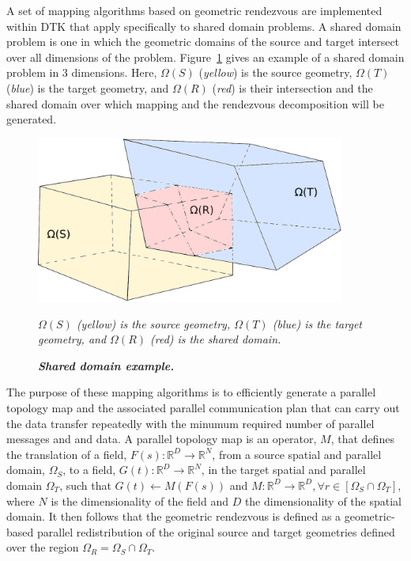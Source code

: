 \documentclass{mc2013}
\begin{document}

A set of mapping algorithms based on geometric rendezvous are
implemented within DTK that apply specifically to shared domain
problems. A shared domain problem is one in which the geometric
domains of the source and target intersect over all dimensions of the
problem. Figure~\ref{fig:shared_domain} gives an example of a shared
domain problem in 3 dimensions. Here, $\Omega(S)$ ({\sl yellow}) is
the source geometry, $\Omega(T)$ ({\sl blue}) is the target geometry,
and $\Omega(R)$ ({\sl red}) is their intersection and the shared
domain over which mapping and the rendezvous decomposition will be
generated.
\begin{figure}[htpb!]
  \centering \includegraphics[width=4in]{overlapping_domain.pdf}
  \caption{\bf \sl Shared domain example.} {\sl $\Omega(S)$ (yellow)
    is the source geometry, $\Omega(T)$ (blue) is the target geometry,
    and $\Omega(R)$ (red) is the shared domain.}
  \label{fig:shared_domain}
\end{figure}
The purpose of these mapping algorithms is to efficiently generate a
parallel topology map and the associated parallel communication plan
that can carry out the data transfer repeatedly with the minumum
required number of parallel messages and and data. A parallel topology
map is an operator, $M$, that defines the translation of a field,
$F(s): \mathbb{R}^D \rightarrow \mathbb{R}^N$, from a source spatial
and parallel domain, $\Omega_S$, to a field, $G(t): \mathbb{R}^D
\rightarrow \mathbb{R}^N$, in the target spatial and parallel domain
$\Omega_T$, such that $G(t)\leftarrow M(F(s))$ and $M: \mathbb{R}^D
\rightarrow \mathbb{R}^D, \forall r \in [\Omega_S \cap \Omega_T]$,
where $N$ is the dimensionality of the field and $D$ the
dimensionality of the spatial domain. It then follows that the
geometric rendezvous is defined as a geometric-based parallel
redistribution of the original source and target geometries defined
over the region $\Omega_R = \Omega_S \cap \Omega_T$.
\end{document}
